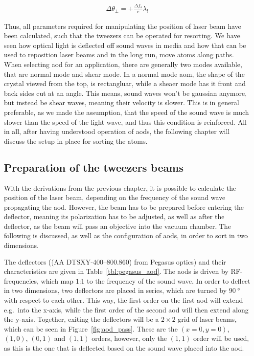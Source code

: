 \begin{align}
	\Delta\theta_\pm = \pm \frac {\Delta f_s}{c} \lambda_l
\end{align}

Thus, all parameters required for manipulating the position of laser beam have been calculated, such that the tweezers can be operated for resorting. We have seen how optical light is deflected off sound waves in media and how that can be used to reposition laser beams and in the long run, move atoms along paths. When selecting \ac{aod} for an application, there are generally two modes available, that are normal mode and shear mode. In a normal mode \ac{aom}, the shape of the crystal viewed from the top, is rectangluar, while a sheaer mode has it front and back sides cut at an angle. This means, sound waves won't be gaussian anymore, but instead be shear waves, meaning their velocity is slower. This is in general preferable, as we made the assumption, that the speed of the sound wave is much slower than the speed of the light wave, and thus this condition is reinforced. All in all, after having understood operation of \acp{aod}, the following chapter will discuss the setup in place for sorting the atoms.

\subsection{Preparation of the tweezers beams}%
\label{sec:tweezer_beams}

With the derivations from the previous chapter, it is possible to calculate the position of the laser beam, depending on the frequency of the sound wave propagating the \ac{aod}. However, the beam has to be prepared before entering the deflector, meaning its polarization has to be adjusted, as well as after the deflector, as the beam will pass an objective into the vacuum chamber. The following is discussed, as well as the configuration of \acp{aod}, in order to sort in two dimensions.

The deflectors ((AA DTSXY-400--800.860) from Pegasus optics) and their characteristics are given in Table~\ref{tbl:pegasus_aod}. The \acp{aod} is driven by RF-frequencies, which map 1:1 to the frequency of the sound wave.  In order to deflect in two dimensions, two deflectors are placed in series, which are turned by $\SI{90}{\degree}$ with respect to each other. This way, the first order on the first \ac{aod} will extend e.g.\ into the x-axis, while the first order of the second \ac{aod} will then extend along the y-axis. Together, exiting the deflectors will be a $2\times2$ grid of laser beams, which can be seen in Figure~\ref{fig:aod_pass}. These are the $(x=0, y=0)$, $(1, 0)$, $(0, 1)$ and $(1, 1)$ orders, however, only the $(1,1)$ order will be used, as this is the one that is deflected based on the sound wave placed into the \ac{aod}.

